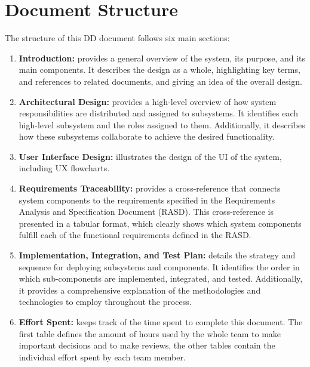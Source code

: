 \section{Document Structure}
The structure of this DD document follows six main sections:
\begin{enumerate}
    \item \textbf{Introduction:}
          provides a general overview of the system, its purpose, and its main components. 
          It describes the design as a whole, highlighting key terms, and references to related documents, and giving an idea of the overall design.

    \item \textbf{Architectural Design:}
          provides a high-level overview of how system responsibilities are distributed and assigned to subsystems. 
          It identifies each high-level subsystem and the roles assigned to them. 
          Additionally, it describes how these subsystems collaborate to achieve the desired functionality.
          
    \item \textbf{User Interface Design:}
          illustrates the design of the UI of the system, including UX flowcharts.
    
    \item \textbf{Requirements Traceability:}
          provides a cross-reference that connects system components to the requirements specified in the Requirements Analysis and Specification Document (RASD). 
          This cross-reference is presented in a tabular format, which clearly shows which system components fulfill each of the functional requirements defined in the RASD.

    \item \textbf{Implementation, Integration, and Test Plan:}   
          details the strategy and sequence for deploying subsystems and components. 
          It identifies the order in which sub-components are implemented, integrated, and tested. Additionally, it provides a comprehensive explanation of the methodologies and technologies to employ throughout the process.

    \item \textbf{Effort Spent:}
          keeps track of the time spent to complete this document.
          The first table defines the amount of hours used by the whole team to make important decisions and to make reviews,
          the other tables contain the individual effort spent by each team member.
\end{enumerate}